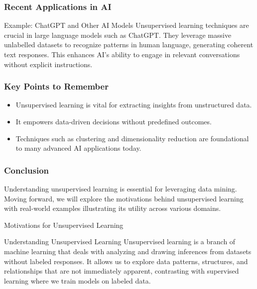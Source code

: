 \documentclass[aspectratio=169]{beamer}
\begin{document}
\begin{frame}[fragile]
    \frametitle{Recent Applications in AI}
    \begin{block}{Example: ChatGPT and Other AI Models}
        Unsupervised learning techniques are crucial in large language models such as ChatGPT. 
        They leverage massive unlabelled datasets to recognize patterns in human language, generating coherent text responses. 
        This enhances AI's ability to engage in relevant conversations without explicit instructions.
    \end{block}
\end{frame}

\begin{frame}[fragile]
    \frametitle{Key Points to Remember}
    \begin{itemize}
        \item Unsupervised learning is vital for extracting insights from unstructured data.
        \item It empowers data-driven decisions without predefined outcomes.
        \item Techniques such as clustering and dimensionality reduction are foundational to many advanced AI applications today.
    \end{itemize}
\end{frame}

\begin{frame}[fragile]
    \frametitle{Conclusion}
    Understanding unsupervised learning is essential for leveraging data mining. 
    Moving forward, we will explore the motivations behind unsupervised learning with real-world examples illustrating its utility across various domains.
\end{frame}

\begin{frame}[fragile]{Motivations for Unsupervised Learning}
    \begin{block}{Understanding Unsupervised Learning}
        Unsupervised learning is a branch of machine learning that deals with analyzing and drawing inferences from datasets without labeled responses. 
        It allows us to explore data patterns, structures, and relationships that are not immediately apparent, contrasting with supervised learning where we train models on labeled data.
    \end{block}
\end{frame}
\end{document}
